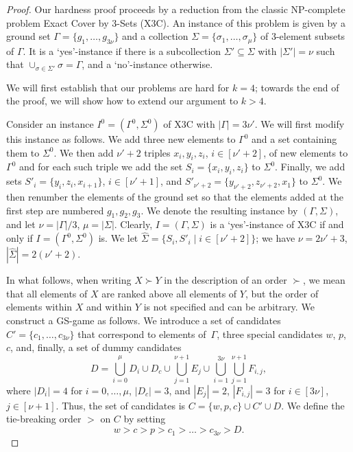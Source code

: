 \documentclass[11pt]{article}
\begin{document}
\begin{proof}
Our hardness proof proceeds by a reduction from the classic NP-complete problem {\sc Exact Cover by 3-Sets (X3C)}.
An instance of this problem is given by a ground set $\Gamma = \{g_1, \dots,g_{3\nu}\}$ and
a collection $\Sigma = \{\sigma_1, \dots, \sigma_\mu\}$ of $3$-element subsets of $\Gamma$.
It is a `yes'-instance if there is a subcollection $\Sigma'\subseteq \Sigma$
with $|\Sigma'|=\nu$ such that $\cup_{\sigma\in \Sigma'}\sigma = \Gamma$, and a `no'-instance otherwise.

We will first establish that our problems are hard for $k=4$; towards the end of the proof, we will show
how to extend our argument to $k>4$.

Consider an instance $I^0 = (\Gamma^0, \Sigma^0)$ of {\sc X3C} with $|\Gamma|=3\nu'$. 
We will first modify this instance as follows. We add three new elements to $\Gamma^0$
and a set containing them to $\Sigma^0$. We then add $\nu'+2$ triples $x_i, y_i, z_i$, 
$i\in[\nu'+2]$, of new elements to $\Gamma^0$ and for each such triple we add 
the set $S_i= \{x_i, y_i, z_i\}$ to $\Sigma^0$. Finally, we add sets $S'_i = \{y_i, z_i, x_{i+1}\}$, 
$i\in[\nu'+1]$, and $S'_{\nu'+2} = \{y_{\nu'+2}, z_{\nu'+2}, x_1\}$ to $\Sigma^0$.
We then renumber the elements of the ground set
so that the elements added at the first step are numbered $g_1, g_2, g_3$.
We denote the resulting instance by $(\Gamma, \Sigma)$, and let $\nu=|\Gamma|/3$, $\mu=|\Sigma|$.
Clearly, $I = (\Gamma, \Sigma)$ is a `yes'-instance of X3C if and only if $I = (\Gamma^0, \Sigma^0)$ is.
We let $\widehat{\Sigma}=\{S_i, S'_i\mid i\in[\nu'+2]\}$; 
we have $\nu = 2\nu'+3$, $|\widehat{\Sigma}|=2(\nu'+2)$. 
 
In what follows, when writing $X \succ Y$ in the description of an order $\succ$,
we mean that all elements of $X$ are ranked above all elements of $Y$, but the order
of elements within $X$ and within $Y$ is not specified and can be arbitrary. 
We construct a GS-game as follows.
We introduce a set of candidates $C'=\{c_1, \dots, c_{3\nu}\}$
that correspond to elements of~$\Gamma$, 
three special candidates $w$, $p$, $c$, and, finally, a set of dummy candidates
$$
D = \bigcup_{i=0}^{\mu} D_i \cup D_c \cup \bigcup_{j=1}^{\nu+1} E_j \cup \bigcup_{i=1}^{3\nu}\bigcup_{j=1}^{\nu+1} F_{i, j}, 
$$
where $|D_i|=4$ for $i=0, \dots, \mu$, $|D_c|=3$, and $|E_j|=2$, $|F_{i, j}|=3$ for $i\in [3\nu]$, $j\in [\nu+1]$. 
Thus, the set of candidates is $C=\{w,p,c\}\cup C'\cup D$.
We define the tie-breaking  order $>$ on $C$ by setting 
$$
w>c>p>c_1>\dots>c_{3\nu}>D.
$$


\end{proof}
\end{document}
